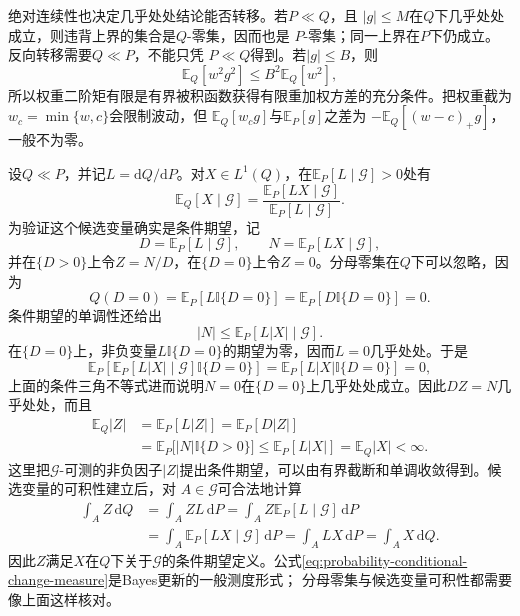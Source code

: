 绝对连续性也决定几乎处处结论能否转移。若\(P\ll Q\)，且
\(|g|\leq M\)在\(Q\)下几乎处处成立，则违背上界的集合是\(Q\)-零集，因而也是
\(P\)-零集；同一上界在\(P\)下仍成立。反向转移需要\(Q\ll P\)，不能只凭
\(P\ll Q\)得到。若\(|g|\leq B\)，则
\[
  \mathbb{E}_Q[w^2g^2]\leq B^2\mathbb{E}_Q[w^2],
\]
所以权重二阶矩有限是有界被积函数获得有限重加权方差的充分条件。把权重截为
\(w_c=\min\{w,c\}\)会限制波动，但
\(\mathbb{E}_Q[w_cg]\)与\(\mathbb{E}_P[g]\)之差为
\(-\mathbb{E}_Q[(w-c)_+g]\)，一般不为零。

设\(Q\ll P\)，并记\(L=\mathrm{d}Q/\mathrm{d}P\)。对\(X\in L^1(Q)\)，在\(\mathbb{E}_P[L\mid\mathcal{G}]>0\)处有
\begin{equation}
  \mathbb{E}_Q[X\mid\mathcal{G}]
  =
  \frac{\mathbb{E}_P[LX\mid\mathcal{G}]}
       {\mathbb{E}_P[L\mid\mathcal{G}]}.
  \label{eq:probability-conditional-change-measure}
\end{equation}
为验证这个候选变量确实是条件期望，记
\[
  D=\mathbb{E}_P[L\mid\mathcal{G}],
  \qquad
  N=\mathbb{E}_P[LX\mid\mathcal{G}],
\]
并在\(\{D>0\}\)上令\(Z=N/D\)，在\(\{D=0\}\)上令\(Z=0\)。分母零集在\(Q\)下可以忽略，因为
\[
  Q(D=0)
  =
  \mathbb{E}_P[L\mathbb{I}\{D=0\}]
  =
  \mathbb{E}_P[D\mathbb{I}\{D=0\}]
  =0.
\]
条件期望的单调性还给出
\[
  |N|
  \leq
  \mathbb{E}_P[L|X|\mid\mathcal{G}].
\]
在\(\{D=0\}\)上，非负变量\(L\mathbb{I}\{D=0\}\)的期望为零，因而\(L=0\)几乎处处。于是
\[
  \mathbb{E}_P\left[
    \mathbb{E}_P[L|X|\mid\mathcal{G}]
    \mathbb{I}\{D=0\}
  \right]
  =
  \mathbb{E}_P[L|X|\mathbb{I}\{D=0\}]
  =0,
\]
上面的条件三角不等式进而说明\(N=0\)在\(\{D=0\}\)上几乎处处成立。因此\(DZ=N\)几乎处处，而且
\[
  \begin{aligned}
    \mathbb{E}_Q|Z|
    &=
    \mathbb{E}_P[L|Z|]
    =
    \mathbb{E}_P[D|Z|]\\
    &=
    \mathbb{E}_P\bigl[|N|\mathbb{I}\{D>0\}\bigr]
    \leq
    \mathbb{E}_P[L|X|]
    =
    \mathbb{E}_Q|X|<\infty.
  \end{aligned}
\]
这里把\(\mathcal{G}\)-可测的非负因子\(|Z|\)提出条件期望，可以由有界截断和单调收敛得到。候选变量的可积性建立后，对
\(A\in\mathcal{G}\)可合法地计算
\[
  \begin{aligned}
    \int_A Z\,\mathrm{d}Q
    &=
    \int_A ZL\,\mathrm{d}P
    =
    \int_A Z\mathbb{E}_P[L\mid\mathcal{G}]\,\mathrm{d}P\\
    &=
    \int_A \mathbb{E}_P[LX\mid\mathcal{G}]\,\mathrm{d}P
    =
    \int_A LX\,\mathrm{d}P
    =
    \int_A X\,\mathrm{d}Q.
  \end{aligned}
\]
因此\(Z\)满足\(X\)在\(Q\)下关于\(\mathcal{G}\)的条件期望定义。公式\eqref{eq:probability-conditional-change-measure}是Bayes更新的一般测度形式；
分母零集与候选变量可积性都需要像上面这样核对。

